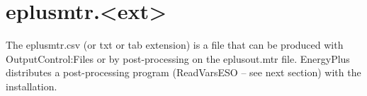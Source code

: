 \section{eplusmtr.\textless{}ext\textgreater{}}\label{eplusmtr.ext}

The eplusmtr.csv (or txt or tab extension) is a file that can be produced with OutputControl:Files or by post-processing on the eplusout.mtr file. EnergyPlus distributes a post-processing program (ReadVarsESO -- see next section) with the installation.
